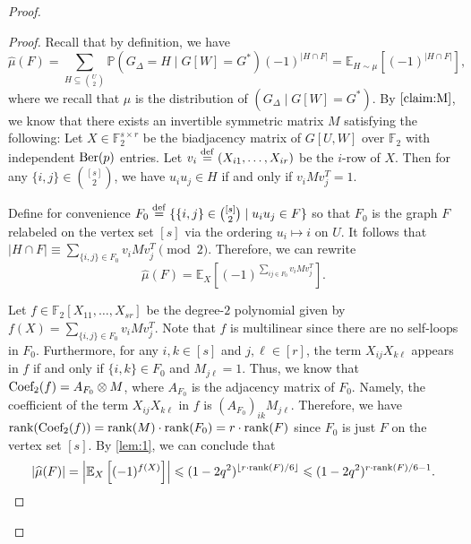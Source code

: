 \documentclass[reqno]{amsart}
\theoremstyle{definition}
\numberwithin{theorem}{section}
\renewcommand{\leq}{\le}
\newcommand{\FF}{\mathbb F}
\def\eqdef{\overset{\rm{def}}{=}}
\renewcommand{\le}{\leqslant}
\newcommand{\EE}{\mathbb E}
\newcommand{\PP}{\mathbb P}
\newcommand{\abs}[1]{\left|#1\right|}
\newcommand{\F}{\mathbb{F}}
\newcommand{\Ber}{\textup{Ber}}
\newcommand{\rank}{\textup{rank}}
\newcommand{\Coef}{\textup{Coef}}
\begin{document}
\begin{proof}
    \begin{proof}
        Recall that by definition, we have
        \[\widehat{\mu}(F)=\sum_{H\subseteq\binom{U}{2}}\PP(G_{\Delta}=H\mid G[W]=G^*)(-1)^{\abs{H\cap F}}=\EE_{H\sim \mu}[(-1)^{\abs{H\cap F}}],\] 
        where we recall that $\mu$ is the distribution of $(G_{\Delta}\mid G[W]=G^*)$. By $\cref{claim:M}$, we know that there exists an invertible symmetric matrix $M$ satisfying the following: Let $X\in \F_2^{s\times r}$ be the biadjacency matrix of $G[U,W]$ over $\F_2$ with independent $\Ber(p)$ entries. Let $v_i\eqdef(X_{i1},\dots,X_{ir})$ be the $i$-row of $X$. Then for any $\{i,j\}\in \binom{[s]}{2}$, we have $u_iu_j\in H$ if and only if $v_iMv_j^T=1$.
        
        Define for convenience $F_0\eqdef\{\{i,j\}\in\binom{[s]}{2}\mid u_iu_j\in F\}$ so that $F_0$ is the graph $F$ relabeled on the vertex set $[s]$ via the ordering $u_i\mapsto i$ on $U$. It follows that $\abs{H\cap F}\equiv \sum_{\{i,j\}\in F_0}v_iMv_j^T\pmod{2}$. Therefore, we can rewrite
        \[\widehat{\mu}(F)=\EE_X\left[(-1)^{\sum_{ij\in F_0}v_iMv_j^T}\right].\]

        Let $f\in \FF_2[X_{11},\dots,X_{sr}]$ be the degree-$2$ polynomial given by $f(X)=\sum_{\{i,j\}\in F_0}v_iMv_j^T$. Note that $f$ is multilinear since there are no self-loops in $F_0$. Furthermore, for any $i,k\in [s]$ and $j,\ell\in [r]$, the term $X_{ij}X_{k\ell}$ appears in $f$ if and only if $\{i,k\}\in F_0$ and $M_{j\ell} = 1$. Thus, we know that $\Coef_2(f)=A_{F_0}\otimes M$, where $A_{F_0}$ is the adjacency matrix of $F_0$. Namely, the coefficient of the term $X_{ij}X_{k\ell}$ in $f$ is $(A_{F_0})_{ik}M_{j\ell}$. Therefore, we have $\rank(\Coef_2(f))=\rank(M)\cdot \rank(F_0) = r\cdot\rank(F)$ since $F_0$ is just $F$ on the vertex set $[s]$. By \cref{lem:1}, we can conclude that
        \[\abs{\widehat{\mu}(F)}=\abs{\EE_X\left[(-1)^{f(X)}\right]}\leq (1-2q^2)^{\lfloor r\cdot\rank(F)/6\rfloor}\leq (1-2q^2)^{r\cdot\rank(F)/6-1}.\qedhere\]
    \end{proof}


\end{proof}
\end{document}
